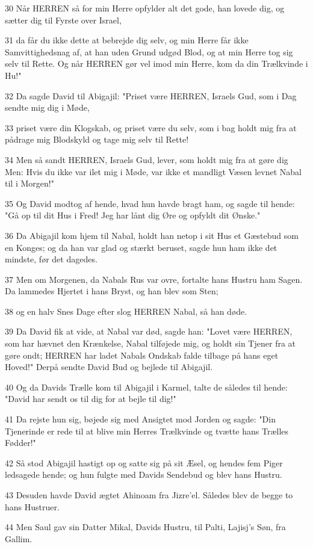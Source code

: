 \par 30 Når HERREN så for min Herre opfylder alt det gode, han lovede dig, og sætter dig til Fyrste over Israel,
\par 31 da får du ikke dette at bebrejde dig selv, og min Herre får ikke Samvittighedsnag af, at han uden Grund udgød Blod, og at min Herre tog sig selv til Rette. Og når HERREN gør vel imod min Herre, kom da din Trælkvinde i Hu!"
\par 32 Da sagde David til Abigajil: "Priset være HERREN, Israels Gud, som i Dag sendte mig dig i Møde,
\par 33 priset være din Klogskab, og priset være du selv, som i bag holdt mig fra at pådrage mig Blodskyld og tage mig selv til Rette!
\par 34 Men så sandt HERREN, Israels Gud, lever, som holdt mig fra at gøre dig Men: Hvis du ikke var ilet mig i Møde, var ikke et mandligt Væsen levnet Nabal til i Morgen!"
\par 35 Og David modtog af hende, hvad hun havde bragt ham, og sagde til hende: "Gå op til dit Hus i Fred! Jeg har lånt dig Øre og opfyldt dit Ønske."
\par 36 Da Abigajil kom hjem til Nabal, holdt han netop i sit Hus et Gæstebud som en Konges; og da han var glad og stærkt beruset, sagde hun ham ikke det mindste, før det dagedes.
\par 37 Men om Morgenen, da Nabals Rus var ovre, fortalte hans Hustru ham Sagen. Da lammedes Hjertet i hans Bryst, og han blev som Sten;
\par 38 og en halv Snes Dage efter slog HERREN Nabal, så han døde.
\par 39 Da David fik at vide, at Nabal var død, sagde han: "Lovet være HERREN, som har hævnet den Krænkelse, Nabal tilføjede mig, og holdt sin Tjener fra at gøre ondt; HERREN har ladet Nabals Ondskab falde tilbage på hans eget Hoved!" Derpå sendte David Bud og bejlede til Abigajil.
\par 40 Og da Davids Trælle kom til Abigajil i Karmel, talte de således til hende: "David har sendt os til dig for at bejle til dig!"
\par 41 Da rejste hun sig, bøjede sig med Ansigtet mod Jorden og sagde: "Din Tjenerinde er rede til at blive min Herres Trælkvinde og tvætte hans Trælles Fødder!"
\par 42 Så stod Abigajil hastigt op og satte sig på sit Æsel, og hendes fem Piger ledsagede hende; og hun fulgte med Davids Sendebud og blev hans Hustru.
\par 43 Desuden havde David ægtet Ahinoam fra Jizre'el. Således blev de begge to hans Hustruer.
\par 44 Men Saul gav sin Datter Mikal, Davids Hustru, til Palti, Lajisj's Søn, fra Gallim.

